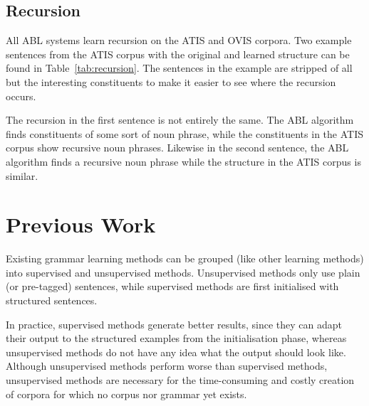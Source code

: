 \documentclass[letterpaper,mlapa]{article}
\begin{document}

\subsection{Recursion}

All ABL systems learn recursion on the ATIS and OVIS corpora. Two example
sentences from the ATIS corpus with the original and learned structure can be
found in Table~\ref{tab:recursion}. The sentences in the example are stripped
of all but the interesting constituents to make it easier to see where the
recursion occurs.

The recursion in the first sentence is not entirely the same. The ABL algorithm
finds constituents of some sort of noun phrase, while the constituents in the
ATIS corpus show recursive noun phrases. Likewise in the second sentence, the
ABL algorithm finds a recursive noun phrase while the structure in the ATIS
corpus is similar.

\section{Previous Work}

Existing grammar learning methods can be grouped (like other learning methods)
into supervised and unsupervised methods. Unsupervised methods only use plain
(or pre-tagged) sentences, while supervised methods are first initialised with
structured sentences.

In practice, supervised methods generate better results, since they can adapt
their output to the structured examples from the initialisation phase, whereas
unsupervised methods do not have any idea what the output should look like.
Although unsupervised methods perform worse than supervised methods,
unsupervised methods are necessary for the time-consuming and costly creation
of corpora for which no corpus nor grammar yet exists.
\end{document}
